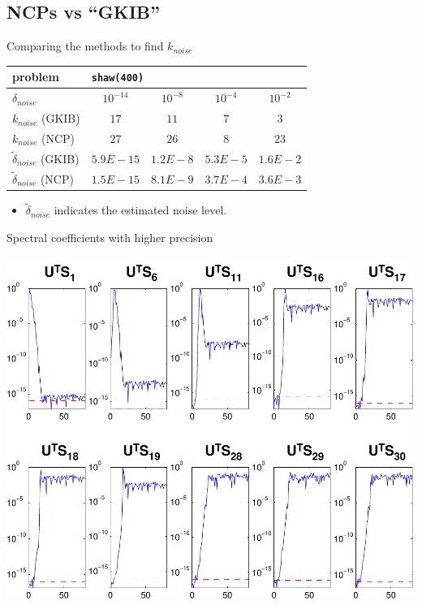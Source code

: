 \documentclass{beamer}
\begin{document}
\subsection{NCPs vs ``GKIB''}
\begin{frame}{Comparing the methods to find $k_{noise}$}
  \begin{center}
    \begin{tabular}{l||c|c|c|c}
      \multicolumn{1}{l||}{problem} & \multicolumn{4}{l}{\texttt{shaw(400)}} \\
      \hline \hline 
      $\delta_{noise}$ & $10^{-14}$ & $10^{-8}$ & $10^{-4}$ & $10^{-2}$ \\
      \hline
      $k_{noise}$ (GKIB) & $17$ & $11$ & $7$ & $3$ \\
      \hline
      $k_{noise}$ (NCP) & $27$ & $26$ & $8$ & $23$ \\
      \hline
      $\tilde{\delta}_{noise}$ (GKIB) & $5.9E-15$ & $1.2E-8$ & $5.3E-5$ &
      $1.6E-2$ \\
      \hline
      $\tilde{\delta}_{noise}$ (NCP) & $1.5E-15$ & $8.1E-9$ & $3.7E-4$ & 
      $3.6E-3$ \\
    \end{tabular}
  \end{center}
  \begin{itemize}
    \item $\tilde{\delta}_{noise}$ indicates the estimated noise level.
    \end{itemize}
\end{frame}

\begin{frame}{Spectral coefficients with higher precision}
  \begin{center}
    \includegraphics[width=0.55\linewidth]{figures_shawvpa/run1/spec_sk}
  \end{center}
\end{frame}
\end{document}
